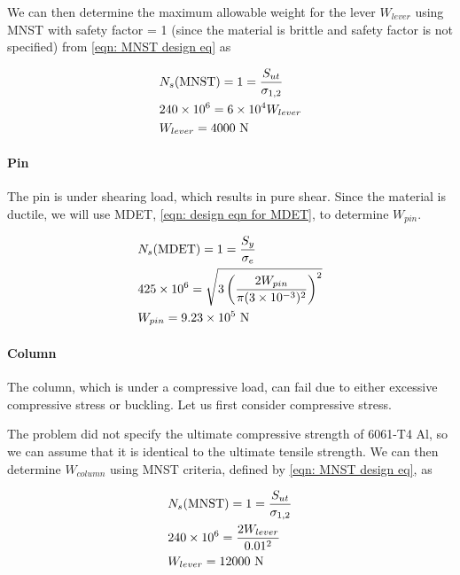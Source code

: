 \documentclass[
10pt,
a4paper,
openany,
svgnames,
]{book}
\begin{document}
We can then determine the maximum allowable weight for the lever $W_{lever}$ using MNST with safety factor = 1 (since the material is brittle and safety factor is not specified) from \cref{eqn: MNST design eq} as

\[\begin{gathered}
  N_s\text{(MNST)} = 1 = \frac{S_{ut}}{\sigma _{1,2}} \hfill \\
  240 \times {10^6} = 6 \times 10^4W_{lever} \hfill \\
  W_{lever} = 4000\text{ N} \hfill \\ 
\end{gathered} \]

\paragraph{Pin}
The pin is under shearing load, which results in pure shear. Since the material is ductile, we will use MDET, \cref{eqn: design eqn for MDET}, to determine $W_{pin}$.

\[\begin{gathered}
  N_s\text{(MDET)} = 1 = \frac{S_y}{\sigma_e} \hfill \\
  425 \times 10^6 = \sqrt {3\left( \frac{2W_{pin}}{\pi (3 \times 10^{-3})^2} \right)^2}  \hfill \\
  W_{pin} = 9.23 \times 10^5\text{ N} \hfill \\ 
\end{gathered} \]

\paragraph{Column}

The column, which is under a compressive load, can fail due to either excessive compressive stress or buckling. Let us first consider compressive stress.

The problem did not specify the ultimate compressive strength of 6061-T4 Al, so we can assume that it is identical to the ultimate tensile strength. We can then determine $W_{column}$ using MNST criteria, defined by \cref{eqn: MNST design eq}, as

\[\begin{gathered}
  N_s\text{(MNST)} = 1 = \frac{S_{ut}}{\sigma_{1,2}} \hfill \\
  240 \times 10^6 = \frac{2W_{lever}}{0.01^2} \hfill \\
  W_{lever} = 12000\text{ N} \hfill \\ 
\end{gathered} \]
\end{document}
